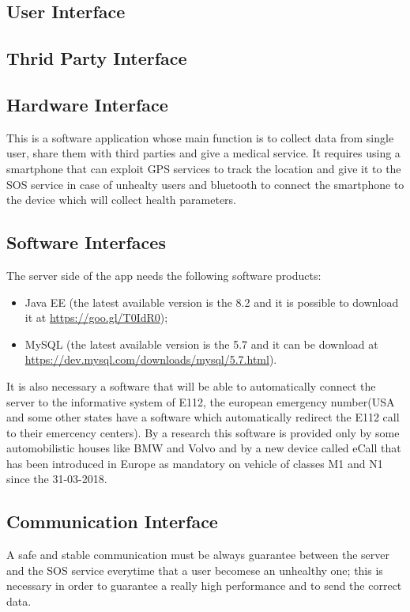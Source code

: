 \subsection{User Interface}


\subsection{Thrid Party Interface}


\subsection{Hardware Interface}

This is a software application whose main function is to collect data from single user, share them with third parties and give a medical service. It requires using a smartphone that can exploit GPS services to track the location and give it to the SOS service in case of unhealty users and bluetooth to connect the smartphone to the device which will collect health parameters.

\subsection{Software Interfaces}
The server side of the app needs the following software products:
\begin{itemize}
	\item Java EE (the latest available version  is the 8.2 and it is possible to download it at \url{https://goo.gl/T0IdR0});
	\item MySQL (the latest available version is the 5.7 and it can be download at \url{
	https://dev.mysql.com/downloads/mysql/5.7.html}).
\end{itemize}It is also necessary a software that will be able to automatically connect the server to the informative system of E112, the european emergency number(USA and some other states have a software which automatically redirect the E112 call to their emercency centers). By a research this software is provided only by some automobilistic houses like BMW and Volvo and by a new device called eCall that has been introduced in Europe as mandatory on vehicle of classes M1 and N1 since the 31-03-2018.

\subsection{Communication Interface}
A safe and stable communication must be always guarantee between the server and the SOS service everytime that a user becomese an unhealthy one; this is necessary in order to guarantee a really high performance and to send the correct data.
